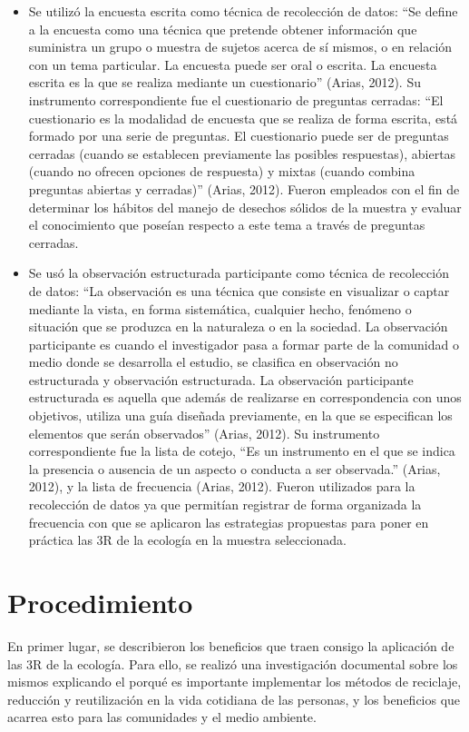 \begin{itemize}
    \item Se utilizó la encuesta escrita como técnica de recolección de datos: “Se define a la encuesta como una técnica que pretende obtener información que suministra un grupo o muestra de sujetos acerca de sí mismos, o en relación con un tema particular. La  encuesta puede ser oral o escrita. La encuesta escrita es la que se realiza mediante un cuestionario” (Arias, 2012). Su instrumento correspondiente fue el cuestionario de preguntas cerradas: “El cuestionario es la modalidad de encuesta que se realiza de forma escrita, está formado por una serie de preguntas. El cuestionario puede ser de preguntas cerradas (cuando se establecen previamente las posibles respuestas), abiertas (cuando no ofrecen opciones de respuesta) y mixtas (cuando combina preguntas abiertas y cerradas)” (Arias, 2012). Fueron empleados con el fin de determinar los hábitos del manejo de desechos sólidos de la muestra y evaluar el conocimiento que poseían respecto a este tema a través de preguntas cerradas.
    
    \item Se usó la observación estructurada participante como técnica de recolección de datos: “La observación es una técnica que consiste en visualizar o captar mediante la vista, en forma sistemática, cualquier hecho, fenómeno o situación que se produzca en la naturaleza o en la sociedad. La observación participante es cuando el investigador pasa a formar parte de la comunidad o medio donde se desarrolla el estudio, se clasifica en observación no estructurada y observación estructurada. La observación participante estructurada es aquella que además de realizarse en correspondencia con unos objetivos, utiliza una guía diseñada previamente, en la que se especifican los elementos que serán observados” (Arias, 2012). Su instrumento correspondiente fue la lista de cotejo, “Es un instrumento en el que se indica la presencia o ausencia de un aspecto o conducta a ser observada.” (Arias, 2012), y la lista de frecuencia  (Arias, 2012). Fueron utilizados para la recolección de datos ya que permitían registrar de forma organizada la frecuencia con que se aplicaron las estrategias propuestas para poner en práctica las 3R de la ecología en la muestra seleccionada.
\end{itemize}

{\setlength{\parskip}{0cm}
\section{Procedimiento}

En primer lugar, se describieron los beneficios que traen consigo la aplicación de las 3R de la ecología. Para ello, se realizó una investigación documental sobre los mismos explicando el porqué es importante implementar los métodos de reciclaje, reducción y reutilización en la vida cotidiana de las personas, y los beneficios que acarrea esto para las comunidades y el medio ambiente.
}

